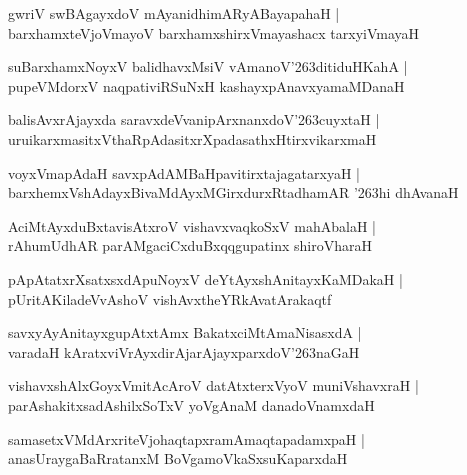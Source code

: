 \documentclass[twoside,12pt,openright]{book}
\def\S{\char'263}
\newcounter{shloka}[chapter]
\begin{document}
\begin{shloka}%
gwriV swBAgayxdoV mAyanidhimARyABayapahaH |\\
barxhamxteVjoVmayoV barxhamxshirxVmayashacx tarxyiVmayaH 
\end{shloka}

\begin{shloka}%
suBarxhamxNoyxV balidhavxMsiV vAmanoV\S ditiduHKahA |\\
pupeVMdorxV naqpativiRSuNxH kashayxpAnavxyamaMDanaH
\end{shloka}

\begin{shloka}%
balisAvxrAjayxda saravxdeVvanipArxnanxdoV\S cuyxtaH |\\
uruikarxmasitxVthaRpAdasitxrXpadasathxHtirxvikarxmaH 
\end{shloka}

\begin{shloka}%
voyxVmapAdaH savxpAdAMBaHpavitirxtajagatarxyaH |\\
barxhemxVshAdayxBivaMdAyxMGirxdurxRtadhamAR \S hi dhAvanaH
\end{shloka}

\begin{shloka}%
AciMtAyxduBxtavisAtxroV vishavxvaqkoSxV mahAbalaH |\\
rAhumUdhAR parAMgaciCxduBxqqgupatinx shiroVharaH 
\end{shloka}

\begin{shloka}%
pApAtatxrXsatxsxdApuNoyxV deYtAyxshAnitayxKaMDakaH |\\
pUritAKiladeVvAshoV vishAvxtheYRkAvatArakaqtf 
\end{shloka}

\begin{shloka}%
savxyAyAnitayxgupAtxtAmx BakatxciMtAmaNisasxdA |\\
varadaH kAratxviVrAyxdirAjarAjayxparxdoV\S naGaH 
\end{shloka}

\begin{shloka}%
vishavxshAlxGoyxVmitAcAroV datAtxterxVyoV muniVshavxraH |\\
parAshakitxsadAshilxSoTxV yoVgAnaM danadoVnamxdaH 
\end{shloka}

\begin{shloka}%
samasetxVMdArxriteVjohaqtapxramAmaqtapadamxpaH |\\
anasUraygaBaRratanxM BoVgamoVkaSxsuKaparxdaH 
\end{shloka}
\end{document}
